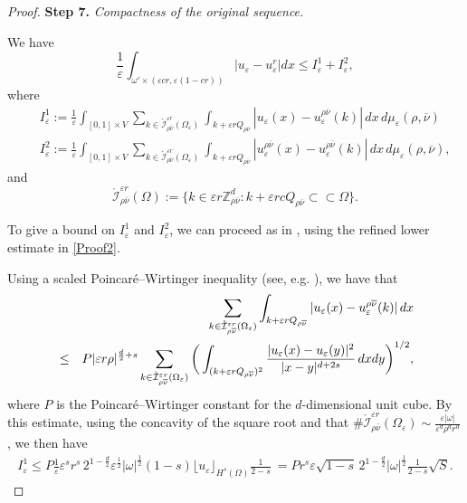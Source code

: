 \documentclass[11pt]{article}
\def\e{\varepsilon}
\begin{document}
\begin{proof}
\medskip
{\bf Step 7.} {\em Compactness of the original sequence.}

\smallskip
We have
\begin{equation}\label{claim-1}
\frac1\e\int_{\omega'\times(\e cr,\e(1-cr))} |u_\e-u^r_\e|dx\le I^1_\e+I^2_\e,
\end{equation}
where
\begin{eqnarray*}
   &&I^1_\e:= \frac1\e \int_{[0,1]\times V} \sum_{{k \in {\mathring{\mathcal I}}^{\e r}_{\rho\overline{\nu}}(\Omega_\e)}} \int_{k+{\e r}Q_{\rho\overline{\nu}}} |u_\e(x) - u^{\rho\overline{\nu}}_\e(k)|\,dx\,d\mu_\e(\rho,\overline{\nu}) \\ \label{L1conv2}
&&I^2_\e:= \frac1\e \int_{[0,1]\times V} \sum_{{k \in {\mathring{\mathcal I}}^{\e r}_{\rho\overline{\nu}}(\Omega_\e)}} \int_{k+{\e r}Q_{\rho\overline{\nu}}} |u^{\rho\overline{\nu}}_\e(x) - u^{\rho\overline{\nu}}_\e(k)|\,dx\,d\mu_\e(\rho,\overline{\nu}),
\end{eqnarray*}
and
\[
{\mathring{\mathcal I}}^{\e r}_{\rho\overline{\nu}}(\Omega):=\{k\in \e r\mathbb Z_{\rho\overline{\nu}}^d : k+\e rc Q_{\rho\overline{\nu}} \subset \subset \Omega\}.
\]

To give a bound on $I^1_\e$ and $I_\e^2$, we can proceed as in \cite[Section 3.1]{BBD}, using the refined lower estimate in \eqref{Proof2}.


Using  a  scaled Poincar\'e--Wirtinger inequality (see, e.g. 
\cite[Theorem 6.33]{leofrac}), we have that
\begin{eqnarray*}\label{attempt4} && \hskip-1cm\nonumber
    \sum_{{k \in {\mathring{\mathcal I}}^{\e r}_{\rho\overline{\nu}}(\Omega_\e)}} \int_{k+{\e r}Q_{\rho\overline{\nu}}} |u_\e(x) - u_\e^{\rho\overline{\nu}}(k)|\,dx  \\ \nonumber 
    &\leq& P|{\e r}\rho|^{\frac{d}{2}+s} \sum_{k \in {\mathring{\mathcal I}}^{\e r}_{\rho\overline{\nu}}(\Omega_\e)}\bigg(\int_{(k+{\e r}Q_{\rho\overline{\nu}})^2}\frac{|u_\e(x)-u_\e(y)|^2}{|x-y|^{d+2s}}\,dxdy\bigg)^{1/2},
    \end{eqnarray*} 
where $P$ is the Poincar\'e--Wirtinger constant for the  $d$-dimensional unit cube. By this estimate, 
using the concavity of the square root and that $\#{\mathring{\mathcal I}}^{\e r}_{\rho\overline{\nu}}(\Omega_\e)\sim \frac{\e|\omega|}{\e^d\rho^{d}r^d}$, we then have 
\begin{eqnarray}\label{I1}
I^1_\e\le P \frac1\e \e^{s} r^s\,2^{1-\frac{d}{2}}\e^{\frac12}|\omega|^{\frac12}(1-s) \lfloor u_\e\rfloor_{H^{s}(\Omega)} \frac{1}{2-s}\ 
= P r^s\e\sqrt{1-s}\,2^{1-\frac{d}{2}}|\omega|^{\frac12} \frac{1}{2-s}  \sqrt{S}.
\end{eqnarray}


\end{proof}
\end{document}
